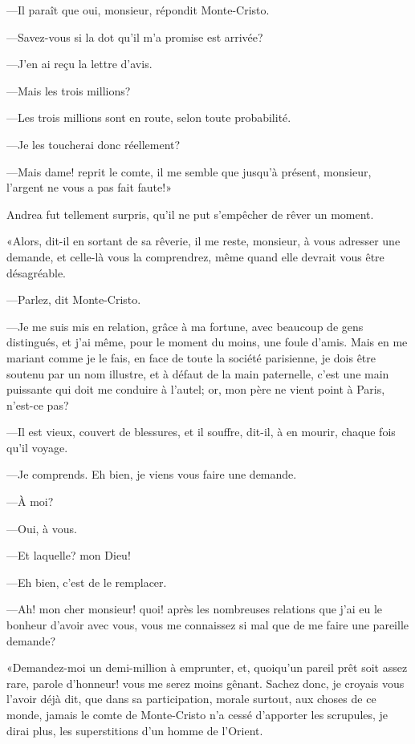 —Il paraît que oui, monsieur, répondit Monte-Cristo. 

—Savez-vous si la dot qu'il m'a promise est arrivée? 

—J'en ai reçu la lettre d'avis. 

—Mais les trois millions? 

—Les trois millions sont en route, selon toute probabilité. 

—Je les toucherai donc réellement? 

—Mais dame! reprit le comte, il me semble que jusqu'à présent, monsieur, l'argent ne vous a pas fait faute!» 

Andrea fut tellement surpris, qu'il ne put s'empêcher de rêver un moment. 

«Alors, dit-il en sortant de sa rêverie, il me reste, monsieur, à vous adresser une demande, et celle-là vous la comprendrez, même quand elle devrait vous être désagréable. 

—Parlez, dit Monte-Cristo. 

—Je me suis mis en relation, grâce à ma fortune, avec beaucoup de gens distingués, et j'ai même, pour le moment du moins, une foule d'amis. Mais en me mariant comme je le fais, en face de toute la société parisienne, je dois être soutenu par un nom illustre, et à défaut de la main paternelle, c'est une main puissante qui doit me conduire à l'autel; or, mon père ne vient point à Paris, n'est-ce pas? 

—Il est vieux, couvert de blessures, et il souffre, dit-il, à en mourir, chaque fois qu'il voyage. 

—Je comprends. Eh bien, je viens vous faire une demande. 

—À moi? 

—Oui, à vous. 

—Et laquelle? mon Dieu! 

—Eh bien, c'est de le remplacer. 

—Ah! mon cher monsieur! quoi! après les nombreuses relations que j'ai eu le bonheur d'avoir avec vous, vous me connaissez si mal que de me faire une pareille demande? 

«Demandez-moi un demi-million à emprunter, et, quoiqu'un pareil prêt soit assez rare, parole d'honneur! vous me serez moins gênant. Sachez donc, je croyais vous l'avoir déjà dit, que dans sa participation, morale surtout, aux choses de ce monde, jamais le comte de Monte-Cristo n'a cessé d'apporter les scrupules, je dirai plus, les superstitions d'un homme de l'Orient. 

